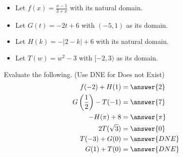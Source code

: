 \documentclass{ximera}
\author{Lee Wayand}
\begin{document}
\begin{exercise}



\begin{itemize}
\item Let $f(x) = \frac{x-1}{3 + x}$ with its natural domain. \\
\item Let $G(t) = -2t + 6$ with $(-5, 1)$ as its domain. \\
\item Let $H(k) =  -|2-k|+6$ with its natural domain. \\
\item Let $T(w) = w^2 - 3$ with $[-2, 3)$ as its domain. \\
\end{itemize}

Evaluate the following.  (Use DNE for Does not Exist) \\






\begin{align*}
f(-2) + H(1)    &=  \answer{2} \\
G\left(\frac{1}{2}\right) - T(-1)   &=  \answer{7} \\
-H(\pi) + 8    &=  \answer{\pi} \\
2 T(\sqrt{3})   &=  \answer{0} \\
T(-3) + G(0) &=  \answer{DNE}  \\
G(1) + T(0)  &=  \answer{DNE}
\end{align*}







\end{exercise}
\end{document}
